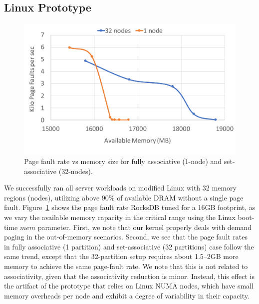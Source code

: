 \subsection{Linux Prototype}
\begin{figure}[t]
   \centering
   \includegraphics[width=1.0\columnwidth]{graphs/realhw.pdf}
   \caption{Page fault rate vs memory size for fully associative (1-node) and set-associative (32-nodes).}
   \label{fig:realhw}
\end{figure}
We successfully ran all server workloads on modified Linux with 32 memory regions (nodes), utilizing above 90\% of available DRAM without a single page fault. Figure~\ref{fig:realhw} shows the page fault rate RocksDB tuned for a 16GB footprint, as we vary the available memory capacity in the critical range using the Linux boot-time $mem$ parameter. First, we note that our kernel properly deals with demand paging in the out-of-memory scenarios. Second, we see that the page fault rates in fully associative (1 partition) and set-associative (32 partitions) case follow the same trend, except that the 32-partition setup requires about 1.5--2GB more memory to achieve the same page-fault rate. We note that this is not related to associativity, given that the associativity reduction is minor. Instead, this effect is the artifact of the prototype that relies on Linux NUMA nodes, which have small memory overheads per node and exhibit a degree of variability in their capacity. 



